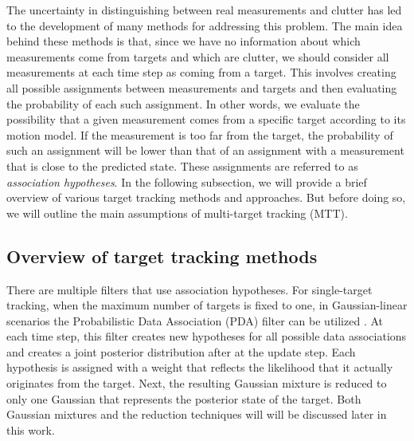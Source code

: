 The uncertainty in distinguishing between real measurements and clutter has led to the development of many methods for addressing this problem. The main idea behind these methods is that, since we have no information about which measurements come from targets and which are clutter, we should consider all measurements at each time step as coming from a target. This involves creating all possible assignments between measurements and targets and then evaluating the probability of each such assignment. In other words, we evaluate the possibility that a given measurement comes from a specific target according to its motion model. If the measurement is too far from the target, the probability of such an assignment will be lower than that of an assignment with a measurement that is close to the predicted state. These assignments are referred to as \textit{association hypotheses}. In the following subsection, we will provide a brief overview of various target tracking methods and approaches. But before doing so, we will outline the main assumptions of multi-target tracking (MTT).

\subsection{Overview of target tracking methods}

There are multiple filters that use association hypotheses. For single-target tracking, when the maximum number of targets is fixed to one, in Gaussian-linear scenarios the Probabilistic Data Association (PDA) filter can be utilized \cite{bar-shalomProbabilisticDataAssociation2009}. At each time step, this filter creates new hypotheses for all possible data associations and creates a joint posterior distribution after at the update step. Each hypothesis is assigned with a weight that reflects the likelihood that it actually originates from the target. Next, the resulting Gaussian mixture is reduced to only one Gaussian that represents the posterior state of the target. Both Gaussian mixtures and the reduction techniques will will be discussed later in this work.

